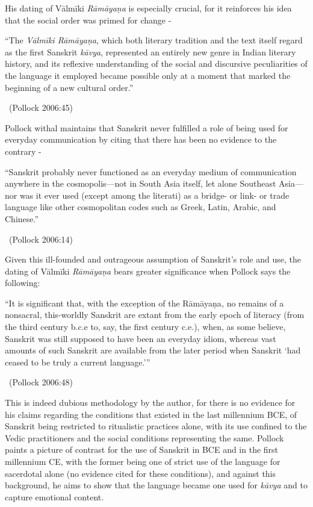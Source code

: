 \newpage

His dating of Vālmīki \textit{Rāmāyaṇa} is especially crucial, for it reinforces his idea that the social order was primed for change -

\begin{myquote}
“The \textit{Vālmīki Rāmāyaṇa}, which both literary tradition and the text itself regard as the first Sanskrit \textit{kāvya}, represented an entirely new genre in Indian literary history, and its reflexive understanding of the social and discursive peculiarities of the language it employed became possible only at a moment that marked the beginning of a new cultural order.” 

~\hfill (Pollock 2006:45)
\end{myquote}

Pollock withal maintains that Sanskrit never fulfilled a role of being used for everyday communication by citing that there has been no evidence to the contrary -

\begin{myquote}
“Sanskrit probably never functioned as an everyday medium of communication anywhere in the cosmopolis—not in South Asia itself, let alone Southeast Asia— nor was it ever used (except among the literati) as a bridge- or link- or trade language like other cosmopolitan codes such as Greek, Latin, Arabic, and Chinese.” 

~\hfill (Pollock 2006:14)
\end{myquote}

Given this ill-founded and outrageous assumption of Sanskrit’s role and use, the dating of Vālmīki \textit{Rāmāyaṇa} bears greater significance when Pollock says the following:

\begin{myquote}
“It is significant that, with the exception of the Rāmāyaṇa\textit{,} no remains of a nonsacral, this-worldly Sanskrit are extant from the early epoch of literacy (from the third century b.c.e to, say, the first century c.e.), when, as some believe, Sanskrit was still supposed to have been an everyday idiom, whereas vast amounts of such Sanskrit are available from the later period when Sanskrit ‘had ceased to be truly a current language.’” 

~\hfill (Pollock 2006:48)
\end{myquote}

This is indeed dubious methodology by the author, for there is no evidence for his claims regarding the conditions that existed in the last millennium BCE, of Sanskrit being restricted to ritualistic practices alone, with its use confined to the Vedic practitioners and the social conditions representing the same. Pollock paints a picture of contrast for the use of Sanskrit in BCE and in the first millennium CE, with the former being one of strict use of the language for sacerdotal alone (no evidence cited for these conditions), and against this background, he aims to show that the language became one used for \textit{kāvya} and to capture emotional content.

